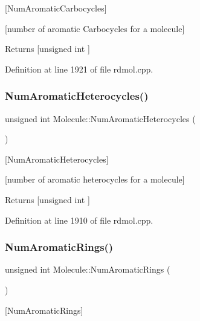 \mbox{[}Num\+Aromatic\+Carbocycles\mbox{]} 

\mbox{[}number of aromatic Carbocycles for a molecule\mbox{]}

\begin{DoxyReturn}{Returns}
\mbox{[}unsigned int \mbox{]} 
\end{DoxyReturn}


Definition at line 1921 of file rdmol.\+cpp.

\mbox{\label{class_molecule_acacbd3d2e5fc65157be32f14ef98f15d}} 
\subsubsection{\texorpdfstring{Num\+Aromatic\+Heterocycles()}{NumAromaticHeterocycles()}}
{\footnotesize\ttfamily unsigned int Molecule\+::\+Num\+Aromatic\+Heterocycles (\begin{DoxyParamCaption}{ }\end{DoxyParamCaption})}



\mbox{[}Num\+Aromatic\+Heterocycles\mbox{]} 

\mbox{[}number of aromatic heterocycles for a molecule\mbox{]}

\begin{DoxyReturn}{Returns}
\mbox{[}unsigned int \mbox{]} 
\end{DoxyReturn}


Definition at line 1910 of file rdmol.\+cpp.

\mbox{\label{class_molecule_a76554ff4fee44adcd1a1ca15eb8e8a7b}} 
\subsubsection{\texorpdfstring{Num\+Aromatic\+Rings()}{NumAromaticRings()}}
{\footnotesize\ttfamily unsigned int Molecule\+::\+Num\+Aromatic\+Rings (\begin{DoxyParamCaption}{ }\end{DoxyParamCaption})}



\mbox{[}Num\+Aromatic\+Rings\mbox{]} 

